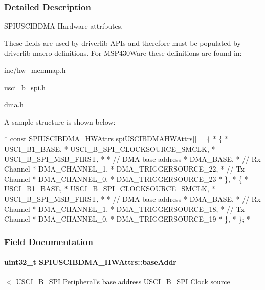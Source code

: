 \subsubsection{Detailed Description}
S\-P\-I\-U\-S\-C\-I\-B\-D\-M\-A Hardware attributes. 

These fields are used by driverlib A\-P\-Is and therefore must be populated by driverlib macro definitions. For M\-S\-P430\-Ware these definitions are found in\-:
\begin{DoxyItemize}
\item inc/hw\-\_\-memmap.\-h
\item usci\-\_\-b\-\_\-spi.\-h
\item dma.\-h
\end{DoxyItemize}

A sample structure is shown below\-: 
\begin{DoxyCode}
*  \textcolor{keyword}{const} SPIUSCIBDMA_HWAttrs spiUSCIBDMAHWAttrs[] = \{
*      \{
*          USCI\_B1\_BASE,
*          USCI\_B\_SPI\_CLOCKSOURCE\_SMCLK,
*          USCI\_B\_SPI\_MSB\_FIRST,
*
*          \textcolor{comment}{// DMA base address}
*          DMA\_BASE,
*          \textcolor{comment}{// Rx Channel}
*          DMA\_CHANNEL\_1,
*          DMA\_TRIGGERSOURCE\_22,
*          \textcolor{comment}{// Tx Channel}
*          DMA\_CHANNEL\_0,
*          DMA\_TRIGGERSOURCE\_23
*      \},
*      \{
*          USCI\_B1\_BASE,
*          USCI\_B\_SPI\_CLOCKSOURCE\_SMCLK,
*          USCI\_B\_SPI\_MSB\_FIRST,
*
*          \textcolor{comment}{// DMA base address}
*          DMA\_BASE,
*          \textcolor{comment}{// Rx Channel}
*          DMA\_CHANNEL\_1,
*          DMA\_TRIGGERSOURCE\_18,
*          \textcolor{comment}{// Tx Channel}
*          DMA\_CHANNEL\_0,
*          DMA\_TRIGGERSOURCE\_19
*      \},
*  \};
*  
\end{DoxyCode}
 

\subsubsection{Field Documentation}
\paragraph[{base\-Addr}]{\setlength{\rightskip}{0pt plus 5cm}uint32\-\_\-t S\-P\-I\-U\-S\-C\-I\-B\-D\-M\-A\-\_\-\-H\-W\-Attrs\-::base\-Addr}\label{struct_s_p_i_u_s_c_i_b_d_m_a___h_w_attrs_aaae9facc7079e3bfd9b7a3b74d6f8652}
$<$ U\-S\-C\-I\-\_\-\-B\-\_\-\-S\-P\-I Peripheral's base address U\-S\-C\-I\-\_\-\-B\-\_\-\-S\-P\-I Clock source 
